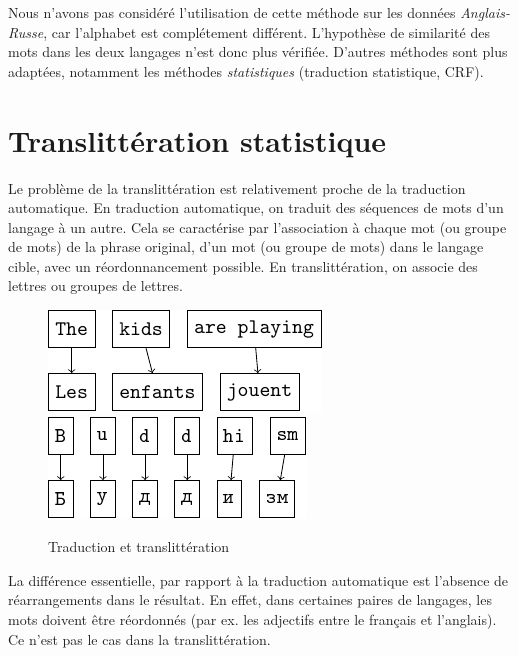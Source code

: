\documentclass{article}
\begin{document}
Nous n'avons pas considéré l'utilisation de cette méthode sur les données \emph{Anglais-Russe}, car l'alphabet est complétement différent. L'hypothèse de similarité des mots dans les deux langages n'est donc plus vérifiée. D'autres méthodes sont plus adaptées, notamment les méthodes \emph{statistiques} (traduction statistique, CRF).


\section{Translittération statistique}
Le problème de la translittération est relativement proche de la traduction automatique. En traduction automatique, on traduit des séquences de mots d'un langage à un autre. Cela se caractérise par l'association à chaque mot (ou groupe de mots) de la phrase original, d'un mot (ou groupe de mots) dans le langage cible, avec un réordonnancement possible. En translittération, on associe des lettres ou groupes de lettres.

\begin{figure}[H]
\label{translation_alignment}
\caption{Traduction et translittération}
\centering
\vspace{0.3cm}
\includegraphics{word_alignment.pdf}
\hspace{0.5cm}
\includegraphics{letter_alignment.pdf}
\end{figure}

La différence essentielle, par rapport à la traduction automatique est l'absence de réarrangements dans le résultat. En effet, dans certaines paires de langages, les mots doivent être réordonnés (par ex. les adjectifs entre le français et l'anglais). Ce n'est pas le cas dans la translittération.
\end{document}
